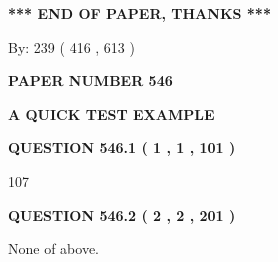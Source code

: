 \documentclass[12pt]{article}
\begin{document}
 
 
 
   
   
 \vspace{0.2in}
 
   
   
   
   
\vspace{1.0in} 
{\textbf{\large{ *** END OF PAPER, THANKS *** }}} 
   
   
\hspace{1.0in} By: 
 239 ( 416 ,  613 )
   
   
   
   
\newpage 
\setcounter{page}{ 
   546001 } 
   
   
   
   
 {\textbf{ \Large{ PAPER NUMBER  546  }}}
   
   
\vspace{0.2in}
   
   
   
   
   
   
 \vspace{0.2in}
{\LARGE {\textbf{ A QUICK TEST EXAMPLE}}}
   
   
  
\vspace{0.2in}
  
{\textbf{\Large{QUESTION
546.1 
 ( 1 , 1 , 101 )
}}}
  
  
 
 
\noindent{}

107
 
 
  
\vspace{0.2in}
  
{\textbf{\Large{QUESTION
546.2 
 ( 2 , 2 , 201 )
}}}
  
  
 
 
\noindent{}
 
 
 None of above.
 
 
 
 
   
   
 \vspace{0.2in}
 
   
   
   
   
\end{document}
